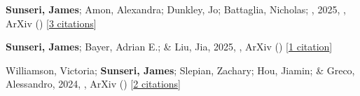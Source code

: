 \item \textbf{Sunseri, James}; Amon, Alexandra; Dunkley, Jo; Battaglia, Nicholas; \etal, 2025, , ArXiv () [\href{https://ui.adsabs.harvard.edu/abs/2025arXiv250520413S}{3 citations}]

\item \textbf{Sunseri, James}; Bayer, Adrian E.; \& Liu, Jia, 2025, , ArXiv () [\href{https://ui.adsabs.harvard.edu/abs/2025arXiv250311778S}{1 citation}]

\item Williamson, Victoria; \textbf{Sunseri, James}; Slepian, Zachary; Hou, Jiamin; \& Greco, Alessandro, 2024, , ArXiv () [\href{https://ui.adsabs.harvard.edu/abs/2024arXiv241203967W}{2 citations}]